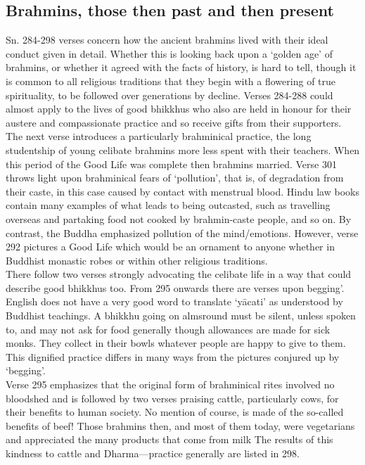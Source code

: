 \subsection{Brahmins, those then past and then present}

Sn. 284-298 verses concern how the ancient brahmins lived with their ideal conduct given in detail. Whether this is looking back upon a `golden age' of brahmins, or whether it agreed with the facts of history, is hard to tell, though it is common to all religious traditions that they begin with a flowering of true spirituality, to be followed over generations by decline. Verses 284-288 could almost apply to the lives of good bhikkhus who also are held in honour for their austere and compassionate practice and so receive gifts from their supporters. The next verse introduces a particularly brahminical practice, the long studentship of young celibate brahmins more less spent with their teachers. When this period of the Good Life was complete then brahmins married. Verse 301 throws light upon brahminical fears of `pollution', that is, of degradation from their caste, in this case caused by contact with menstrual blood. Hindu law books contain many examples of what leads to being outcasted, such as travelling overseas and partaking food not cooked by brahmin-caste people, and so on. By contrast, the Buddha emphasized pollution of the mind/emotions. However, verse 292 pictures a Good Life which would be an ornament to anyone whether in Buddhist monastic robes or within other religious traditions.\\

There follow two verses strongly advocating the celibate life in a way that could describe good bhikkhus too. From 295 onwards there are verses upon begging'. English does not have a very good word to translate `y\=acati' as understood by Buddhist teachings. A bhikkhu going on almsround must be silent, unless spoken to, and may not ask for food generally though allowances are made for sick monks. They collect in their bowls whatever people are happy to give to them. This dignified practice differs in many ways from the pictures conjured up by `begging'.\\

Verse 295 emphasizes that the original form of brahminical rites involved no bloodshed and is followed by two verses praising cattle, particularly cows, for their benefits to human society. No mention of course, is made of the so-called benefits of beef! Those brahmins then, and most of them today, were vegetarians and appreciated the many products that come from milk The results of this kindness to cattle and Dharma—practice generally are listed in 298.\\

